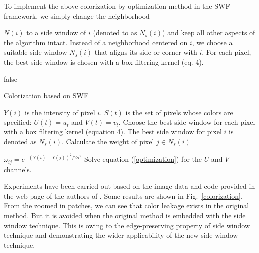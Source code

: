 \documentclass[10pt,twocolumn,letterpaper]{article}
\begin{document}
To implement the above colorization by optimization method in the SWF framework, we simply change the neighborhood {$N(i)$ to a side window of $i$ (denoted to as $N_s(i)$) and keep all other aspects of the algorithm intact. Instead of a neighborhood centered on $i$, we choose a suitable side window $N_s(i)$ that aligns its side or corner with $i$. For each pixel, the best side window is chosen with a box filtering kernel (eq. 4). 

\if false
	\begin{algorithm}[!htbp]
		\caption{Colorization based on SWF} \label{algo_color}
		\begin{algorithmic}[1]
			\REQUIRE $Y(i)$ is the intensity of pixel $i$. $S(t)$ is the set of pixels whose colors are specified: $U(t)=u_t$ and $V(t)=v_t$.
			\STATE Choose the best side window for each pixel with a box filtering kernel (equation 4). The best side window for pixel $i$ is denoted as $N_s(i)$.
			\STATE Calculate the weight of pixel $j\in N_s(i)$ 
			
			$\omega_{ij} = e^{-(Y(i)-Y(j))^2/{2\sigma^2}}$
\STATE Solve equation (\ref{optimization}) for the $U$ and $V$ channels.
\end{algorithmic}
	\end{algorithm}
	\fi
	Experiments have been carried out based on the image data and code provided in the web page of the authors of \cite{colorization}. Some results are shown in Fig.~\ref{colorization}. From the zoomed in patches, we can see that color leakage exists in the original method. But it is avoided when the original method is embedded with the side window technique. This is owing to the edge-preserving property of side window technique and demonstrating the wider applicability of the new side window technique. 
	
}
\end{document}
